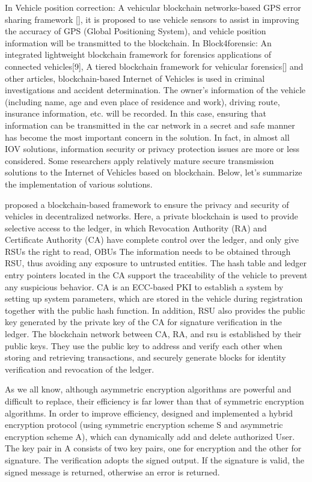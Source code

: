 In Vehicle position correction: A vehicular blockchain networks-based GPS error sharing framework [], it is proposed to use vehicle sensors to assist in improving the accuracy of GPS (Global Positioning System), and vehicle position information will be transmitted to the blockchain. In Block4forensic: An integrated lightweight blockchain framework for forensics applications of connected vehicles[9], A tiered blockchain framework for vehicular forensics[] and other articles, blockchain-based Internet of Vehicles is used in criminal investigations and accident determination. The owner's information of the vehicle (including name, age and even place of residence and work), driving route, insurance information, etc. will be recorded.
In this case, ensuring that information can be transmitted in the car network in a secret and safe manner has become the most important concern in the solution. In fact, in almost all IOV solutions, information security or privacy protection issues are more or less considered. Some researchers apply relatively mature secure transmission solutions to the Internet of Vehicles based on blockchain. Below, let's summarize the implementation of various solutions.


\cite{ref35} proposed a blockchain-based framework to ensure the privacy and security of vehicles in decentralized networks. Here, a private blockchain is used to provide selective access to the ledger, in which Revocation Authority (RA) and Certificate Authority (CA) have complete control over the ledger, and only give RSUs the right to read, OBUs The information needs to be obtained through RSU, thus avoiding any exposure to untrusted entities. The hash table and ledger entry pointers located in the CA support the traceability of the vehicle to prevent any suspicious behavior. CA is an ECC-based PKI to establish a system by setting up system parameters, which are stored in the vehicle during registration together with the public hash function. In addition, RSU also provides the public key generated by the private key of the CA for signature verification in the ledger. The blockchain network between CA, RA, and rsu is established by their public keys. They use the public key to address and verify each other when storing and retrieving transactions, and securely generate blocks for identity verification and revocation of the ledger.

As we all know, although asymmetric encryption algorithms are powerful and difficult to replace, their efficiency is far lower than that of symmetric encryption algorithms. In order to improve efficiency, \cite{ref57} designed and implemented a hybrid encryption protocol (using symmetric encryption scheme S and asymmetric encryption scheme A), which can dynamically add and delete authorized User. The key pair in A consists of two key pairs, one for encryption and the other for signature. The verification adopts the signed output. If the signature is valid, the signed message is returned, otherwise an error is returned.


